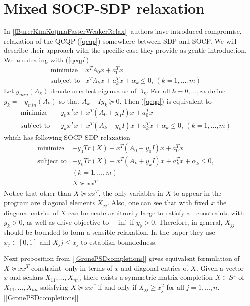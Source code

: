 \documentclass[10pt,oneside]{book}
\theoremstyle{definition}
\begin{document}
\section{Mixed SOCP-SDP relaxation}

In [\ref{BurerKimKojimaFasterWeakerRelax}] authors have introduced compromise, relaxation of the QCQP (\ref{qcqp}) somewhere between SDP and SOCP. We will describe their approach with the specific case they provide as gentle introduction.
We are dealing with (\ref{qcqp})
\begin{equation}
\begin{array}{ll}
\mbox{minimize}& x^TA_0x + a_0^Tx \\
\mbox{subject to}& x^TA_kx + a_k^Tx + \alpha_k \leq 0, \  (k = 1,\dots ,m)
\end{array} 
\end{equation}
Let  $y_{min}(A_k)$ denote smallest eigenvalue of $A_k$.
For all $k=0,\dots ,m$ define $y_k=-y_{min}(A_k)$ so that $A_k + Iy_k\succeq 0$. Then (\ref{qcqp}) is equivalent to 
\begin{equation}
\begin{array}{ll}
\mbox{minimize}& -y_0 x^Tx +  x^T(A_0+y_0 I)x + a_0^Tx \\
\mbox{subject to}& -y_kx^Tx +  x^T(A_k+y_kI)x + a_k^Tx + \alpha_k \leq 0, \  (k = 1,\dots ,m)
\end{array} 
\end{equation}
which has following SOCP-SDP relaxation
\begin{equation}
\label{InBetweenSOCPSDP1}
\begin{array}{ll}
\mbox{minimize}& -y_0 Tr(X) +  x^T(A_0+y_0 I)x + a_0^Tx \\
\mbox{subject to}& -y_k Tr(X) +  x^T(A_k+y_kI)x + a_k^Tx + \alpha_k \leq 0, \\  
&(k = 1,\dots ,m) \\
& X\succeq xx^T
\end{array} 
\end{equation}
Notice that other than $X\succeq xx^T$, the only variables in $X$ to appear in the program are diagonal elements $X_{jj}$.
Also, one can see that with fixed $x$ the diagonal entries of $X$ can be made arbitrarily large to satisfy all constraints with $y_k>0$, as well as drive objective to $-\inf$ if $y_0>0$. Therefore, in general, $X_{jj}$ should be bounded to form a sensible relaxation. In the paper they use $x_j\in [0,1]$ and $X_jj\leq x_j$ to establish boundedness.

Next proposition from [\ref{GronePSDcompletions}] gives equivalent formulation of $X\succeq xx^T$ constraint, only in terms of $x$ and diagonal entries of $X$.
\prop Given a vector $x$ and scalars $X_{11},\dots ,X_{nn}$, there exists
a symmetric-matrix completion $X\in S^n$ of $X_{11},\dots ,X_{nn}$ satisfying $X \succeq xx^T$ if and only if $X_{jj} \geq x^2_j$ for all $j = 1,\dots ,n.$ \rm [\ref{GronePSDcompletions}]
\end{document}
